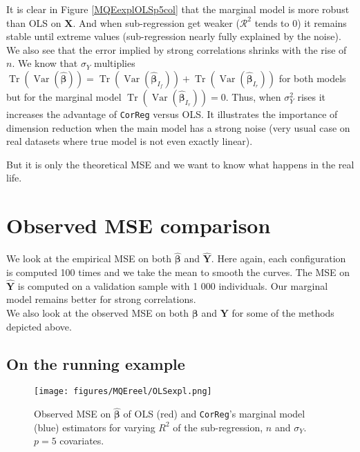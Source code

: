 \documentclass[12pt,a4paper]{report}
\begin{document}
It is clear in Figure \ref{MQEexplOLSp5col} that the marginal model is more robust than \textsc{OLS} on $\boldsymbol{X}$. And when sub-regression get weaker ($\mathcal{R}^2$ tends to 0) it remains stable until extreme values (sub-regression nearly fully explained by the noise). We also see that the error implied by strong correlations shrinks with the rise of $n$. 
We know that $\sigma_Y$ multiplies $\operatorname{Tr}(\operatorname{Var}(\hat{\boldsymbol{\beta}}))=\operatorname{Tr}(\operatorname{Var}(\hat{\boldsymbol{\beta}}_{I_f}))+\operatorname{Tr}(\operatorname{Var}(\hat{\boldsymbol{\beta}}_{I_r}))$ for both models but for the marginal model $\operatorname{Tr}(\operatorname{Var}(\hat{\boldsymbol{\beta}}_{I_r}))=0$.
 Thus, when $\sigma_Y^2$ rises it increases the advantage of {\tt CorReg} versus \textsc{OLS}. It illustrates the importance of dimension reduction when the main model has a strong noise (very usual case on real datasets where true model is not even exactly linear). 
 
But it is only the theoretical MSE and we want to know what happens in the real life. 
\section{Observed MSE comparison}\label{MSEvraiS}
We look at the empirical MSE on both $\hat{\boldsymbol{\beta}}$ and $\hat{\boldsymbol{Y}}$. Here again, each configuration is computed 100 times and we take the mean to smooth the curves. The MSE on $\hat{\boldsymbol{Y}}$ is computed on a validation sample with 1 000 individuals. Our marginal model remains better for strong correlations.\\

	We also look at the observed MSE on both $\boldsymbol{\beta}$ and $\boldsymbol{Y}$ for some of the methods depicted above.
	\subsection{On the running example}
 \begin{figure}[h!]
	\texttt{[image: figures/MQEreel/OLSexpl.png]}
	\caption{Observed MSE on $\hat{\boldsymbol{\beta}}$ of OLS (red) and {\tt CorReg}'s marginal model (blue) estimators for varying $R^2$ of the sub-regression, $n$ and $\sigma_Y$. $p=5$ covariates.}\label{MSEOLSexpl}
\end{figure} 
	
\end{document}

